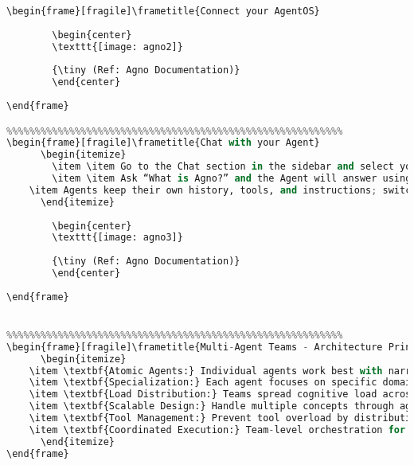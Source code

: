 \begin{frame}[fragile]
\begin{lstlisting}[language=python, basicstyle=\tiny]
%%%%%%%%%%%%%%%%%%%%%%%%%%%%%%%%%%%%%%%%%%%%%%%%%%%%%%%%%%%
\begin{frame}[fragile]\frametitle{Connect your AgentOS}
	  
		\begin{center}
		\texttt{[image: agno2]}
		
		{\tiny (Ref: Agno Documentation)}
		\end{center}	
	  
\end{frame}

%%%%%%%%%%%%%%%%%%%%%%%%%%%%%%%%%%%%%%%%%%%%%%%%%%%%%%%%%%%
\begin{frame}[fragile]\frametitle{Chat with your Agent}
      \begin{itemize}
		\item \item Go to the Chat section in the sidebar and select your Agent.
		\item \item Ask “What is Agno?” and the Agent will answer using the Agno MCP server.
	\item Agents keep their own history, tools, and instructions; switching users won’t mix context.
	  \end{itemize}
	  
		\begin{center}
		\texttt{[image: agno3]}
		
		{\tiny (Ref: Agno Documentation)}
		\end{center}	
	  
\end{frame}


%%%%%%%%%%%%%%%%%%%%%%%%%%%%%%%%%%%%%%%%%%%%%%%%%%%%%%%%%%%
\begin{frame}[fragile]\frametitle{Multi-Agent Teams - Architecture Principles}
      \begin{itemize}
	\item \textbf{Atomic Agents:} Individual agents work best with narrow scope and limited tools
	\item \textbf{Specialization:} Each agent focuses on specific domain expertise
	\item \textbf{Load Distribution:} Teams spread cognitive load across multiple agents
	\item \textbf{Scalable Design:} Handle multiple concepts through agent collaboration
	\item \textbf{Tool Management:} Prevent tool overload by distributing capabilities
	\item \textbf{Coordinated Execution:} Team-level orchestration for complex tasks
	  \end{itemize}
\end{frame}


\end{lstlisting}
\end{frame}
